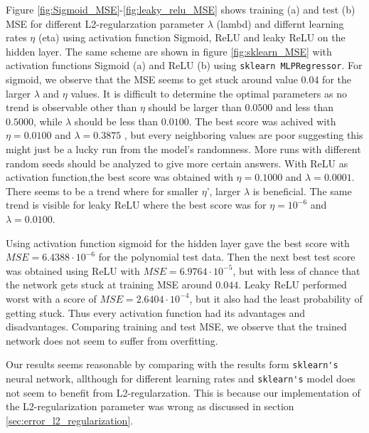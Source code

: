 Figure \ref{fig:Sigmoid_MSE}-\ref{fig:leaky_relu_MSE} shows training (a) and test (b) MSE for different 
L2-regularzation parameter $\lambda $ (lambd) and differnt learning rates $\eta $ (eta) using activation function Sigmoid, ReLU and leaky 
ReLU on the hidden layer. The same scheme are shown in figure \ref{fig:sklearn_MSE} with activation functions Sigmoid (a) 
and ReLU (b) using \verb|sklearn MLPRegressor|. For sigmoid, we observe that the MSE seems to get stuck around value 0.04
for the larger $\lambda $ and $\eta $ values. %
It is difficult to determine the optimal parameters as no trend is observable other than $\eta $ should be larger than 
$0.0500$ and less than $0.5000$, while $\lambda $ should be less than $0.0100$. The best score was achived with 
$\eta =0.0100$ and $\lambda = 0.3875$ , but every neighboring values are poor suggesting this might just be a lucky run from the 
model's randomness. More runs with different 
random seeds should be analyzed to give more certain answers. 
With ReLU as activation function,the best score was obtained with $\eta =0.1000$ and $\lambda  =0.0001$. There seems to be a trend 
where for smaller $\eta $', larger $\lambda $ is beneficial. The same trend is visible for leaky ReLU where the best score 
was for $\eta= 10^{-6}$ and $\lambda = 0.0100$.

Using activation function sigmoid for the hidden layer gave the best score with $MSE=6.4388 \cdot 10^{-6}$ for the polynomial test data.
Then the next best test score was obtained using ReLU with $MSE=6.9764 \cdot 10^{-5}$, but with less of chance that the network 
gets stuck at training MSE around $0.044$. Leaky ReLU performed worst with a score of $MSE=2.6404 \cdot 10^{-4}$, but it also 
had the least probability of getting stuck. Thus every activation function had its advantages and disadvantages. Comparing 
training and test MSE, we observe that the trained network does not seem to suffer from overfitting.  

Our results seems reasonable by comparing with the results form \verb|sklearn's| neural network, allthough for different learning rates
and \verb|sklearn's| model does not seem to benefit from L2-regularzation. This is because our implementation of the L2-regularization 
parameter was wrong as discussed in section \ref{sec:error_l2_regularization}.


